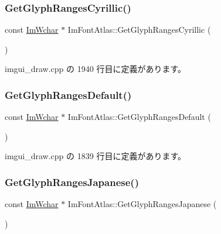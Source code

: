 \subsubsection{\texorpdfstring{Get\+Glyph\+Ranges\+Cyrillic()}{GetGlyphRangesCyrillic()}}
{\footnotesize\ttfamily const \mbox{\hyperlink{imgui_8h_af2c7badaf05a0008e15ef76d40875e97}{Im\+Wchar}} $\ast$ Im\+Font\+Atlas\+::\+Get\+Glyph\+Ranges\+Cyrillic (\begin{DoxyParamCaption}{ }\end{DoxyParamCaption})}



 imgui\+\_\+draw.\+cpp の 1940 行目に定義があります。

\mbox{\label{struct_im_font_atlas_adec0df140eb1dc01c2a22a5253d62820}} 
\subsubsection{\texorpdfstring{Get\+Glyph\+Ranges\+Default()}{GetGlyphRangesDefault()}}
{\footnotesize\ttfamily const \mbox{\hyperlink{imgui_8h_af2c7badaf05a0008e15ef76d40875e97}{Im\+Wchar}} $\ast$ Im\+Font\+Atlas\+::\+Get\+Glyph\+Ranges\+Default (\begin{DoxyParamCaption}{ }\end{DoxyParamCaption})}



 imgui\+\_\+draw.\+cpp の 1839 行目に定義があります。

\mbox{\label{struct_im_font_atlas_a2654afbbf73835bf08278cdc6c181a96}} 
\subsubsection{\texorpdfstring{Get\+Glyph\+Ranges\+Japanese()}{GetGlyphRangesJapanese()}}
{\footnotesize\ttfamily const \mbox{\hyperlink{imgui_8h_af2c7badaf05a0008e15ef76d40875e97}{Im\+Wchar}} $\ast$ Im\+Font\+Atlas\+::\+Get\+Glyph\+Ranges\+Japanese (\begin{DoxyParamCaption}{ }\end{DoxyParamCaption})}



